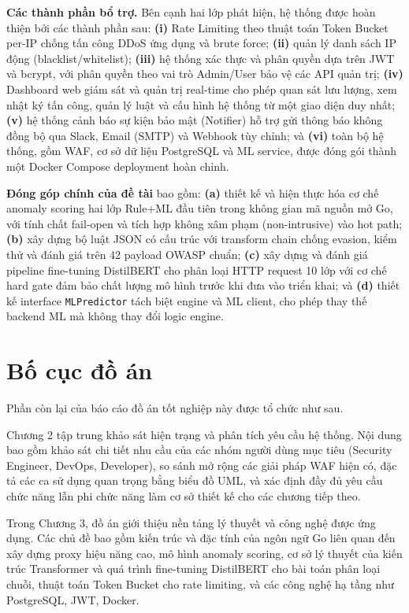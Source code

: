 \documentclass[../DoAn.tex]{subfiles}
\begin{document}
\textbf{Các thành phần bổ trợ.} Bên cạnh hai lớp phát hiện, hệ thống được hoàn
thiện bởi các thành phần sau: \textbf{(i)} Rate Limiting theo thuật toán Token
Bucket per-IP chống tấn công DDoS ứng dụng và brute force; \textbf{(ii)} quản
lý danh sách IP động (blacklist/whitelist); \textbf{(iii)} hệ thống xác thực và
phân quyền dựa trên JWT và bcrypt, với phân quyền theo vai trò Admin/User bảo
vệ các API quản trị; \textbf{(iv)} Dashboard web giám sát và quản trị real-time
cho phép quan sát lưu lượng, xem nhật ký tấn công, quản lý luật và cấu hình hệ
thống từ một giao diện duy nhất; \textbf{(v)} hệ thống cảnh báo sự kiện bảo mật
(Notifier) hỗ trợ gửi thông báo không đồng bộ qua Slack, Email (SMTP) và
Webhook tùy chỉnh; và \textbf{(vi)} toàn bộ hệ thống, gồm WAF, cơ sở dữ liệu
PostgreSQL và ML service, được đóng gói thành một Docker Compose deployment
hoàn chỉnh.

\textbf{Đóng góp chính của đề tài} bao gồm: \textbf{(a)} thiết kế và hiện thực
hóa cơ chế anomaly scoring hai lớp Rule+ML đầu tiên trong không gian mã nguồn
mở Go, với tính chất fail-open và tích hợp không xâm phạm (non-intrusive) vào
hot path; \textbf{(b)} xây dựng bộ luật JSON có cấu trúc với transform chain
chống evasion, kiểm thử và đánh giá trên 42 payload OWASP chuẩn; \textbf{(c)}
xây dựng và đánh giá pipeline fine-tuning DistilBERT cho phân loại HTTP request
10 lớp với cơ chế hard gate đảm bảo chất lượng mô hình trước khi đưa vào triển
khai; và \textbf{(d)} thiết kế interface \texttt{MLPredictor} tách biệt engine và
ML client, cho phép thay thế backend ML mà không thay đổi logic engine.

\section{Bố cục đồ án}
\label{section:1.4}

Phần còn lại của báo cáo đồ án tốt nghiệp này được tổ chức như sau.

Chương 2 tập trung khảo sát hiện trạng và phân tích yêu cầu hệ thống. Nội dung
bao gồm khảo sát chi tiết nhu cầu của các nhóm người dùng mục tiêu (Security
Engineer, DevOps, Developer), so sánh mở rộng các giải pháp WAF hiện có, đặc
tả các ca sử dụng quan trọng bằng biểu đồ UML, và xác định đầy đủ yêu cầu chức
năng lẫn phi chức năng làm cơ sở thiết kế cho các chương tiếp theo.

Trong Chương 3, đồ án giới thiệu nền tảng lý thuyết và công nghệ được ứng dụng.
Các chủ đề bao gồm kiến trúc và đặc tính của ngôn ngữ Go liên quan đến xây
dựng proxy hiệu năng cao, mô hình anomaly scoring, cơ sở lý thuyết của kiến trúc
Transformer và quá trình fine-tuning DistilBERT cho bài toán phân loại chuỗi,
thuật toán Token Bucket cho rate limiting, và các công nghệ hạ tầng như PostgreSQL,
JWT, Docker.
\end{document}
